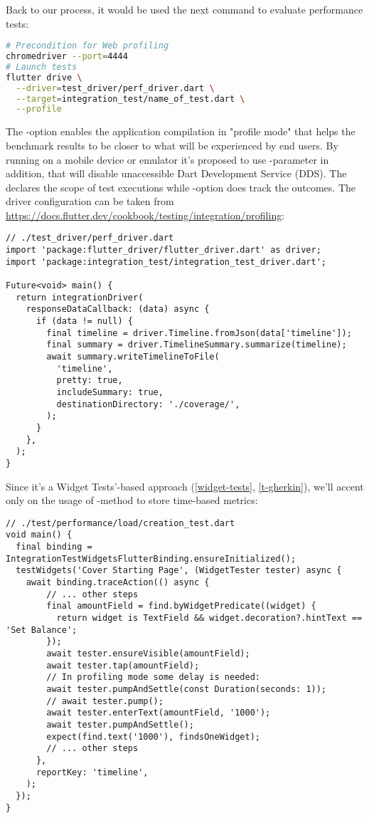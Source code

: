 \noindent Back to our process, it would be used the next command to evaluate performance tests:

\begin{lstlisting}[language=bash]
# Precondition for Web profiling
chromedriver --port=4444
# Launch tests
flutter drive \
  --driver=test_driver/perf_driver.dart \
  --target=integration_test/name_of_test.dart \
  --profile
\end{lstlisting}

The -option enables the application compilation in "profile mode" that helps the benchmark results to be
closer to what will be experienced by end users. By running on a mobile device or emulator it's proposed to use 
-parameter in addition, that will disable unaccessible Dart Development Service (DDS). The  
declares the scope of test executions while \q{--driver}-option does track the outcomes. The driver configuration can be
taken from \href{https://docs.flutter.dev/cookbook/testing/integration/profiling}{https://docs.flutter.dev/cookbook/testing/integration/profiling}:

\begin{lstlisting}
// ./test_driver/perf_driver.dart
import 'package:flutter_driver/flutter_driver.dart' as driver;
import 'package:integration_test/integration_test_driver.dart';

Future<void> main() {
  return integrationDriver(
    responseDataCallback: (data) async {
      if (data != null) {
        final timeline = driver.Timeline.fromJson(data['timeline']);
        final summary = driver.TimelineSummary.summarize(timeline);
        await summary.writeTimelineToFile(
          'timeline',
          pretty: true,
          includeSummary: true,
          destinationDirectory: './coverage/',
        );
      }
    },
  );
}
\end{lstlisting}

\noindent Since it's a Widget Tests'-based approach (\ref{widget-tests}, \ref{t-gherkin}), we'll accent only on the 
usage of -method to store time-based metrics:

\begin{lstlisting}
// ./test/performance/load/creation_test.dart
void main() {
  final binding = IntegrationTestWidgetsFlutterBinding.ensureInitialized();
  testWidgets('Cover Starting Page', (WidgetTester tester) async {
    await binding.traceAction(() async {
        // ... other steps
        final amountField = find.byWidgetPredicate((widget) {
          return widget is TextField && widget.decoration?.hintText == 'Set Balance';
        });
        await tester.ensureVisible(amountField);
        await tester.tap(amountField);
        // In profiling mode some delay is needed:
        await tester.pumpAndSettle(const Duration(seconds: 1));
        // await tester.pump();
        await tester.enterText(amountField, '1000');
        await tester.pumpAndSettle();
        expect(find.text('1000'), findsOneWidget);
        // ... other steps
      },
      reportKey: 'timeline',
    );
  });
}
\end{lstlisting}

